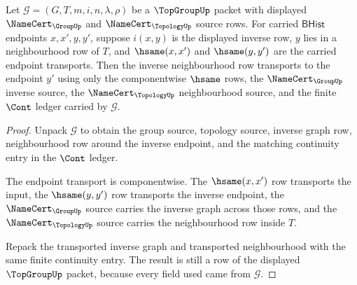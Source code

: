 \begin{theorem}
\label{thm:topgroup-inverse-neighbourhood-transport}
Let $\mathcal G=(G,T,m,i,n,\lambda,\rho)$ be a $\TopGroupUp$ packet with
displayed $\NameCert_{\GroupUp}$ and $\NameCert_{\TopologyUp}$ source rows.
For carried $\mathsf{BHist}$ endpoints $x,x',y,y'$, suppose $i(x,y)$ is the
displayed inverse row, $y$ lies in a neighbourhood row of $T$, and
$\hsame(x,x')$ and $\hsame(y,y')$ are the carried endpoint transports. Then
the inverse neighbourhood row transports to the endpoint $y'$ using only the
componentwise $\hsame$ rows, the $\NameCert_{\GroupUp}$ inverse source, the
$\NameCert_{\TopologyUp}$ neighbourhood source, and the finite $\Cont$ ledger
carried by $\mathcal G$.
\end{theorem}
\begin{proof}
Unpack $\mathcal G$ to obtain the group source, topology source, inverse graph
row, neighbourhood row around the inverse endpoint, and the matching
continuity entry in the $\Cont$ ledger.

The endpoint transport is componentwise. The $\hsame(x,x')$ row transports the
input, the $\hsame(y,y')$ row transports the inverse endpoint, the
$\NameCert_{\GroupUp}$ source carries the inverse graph across those rows, and
the $\NameCert_{\TopologyUp}$ source carries the neighbourhood row inside
$T$.

Repack the transported inverse graph and transported neighbourhood with the
same finite continuity entry. The result is still a row of the displayed
$\TopGroupUp$ packet, because every field used came from $\mathcal G$.
\end{proof}

